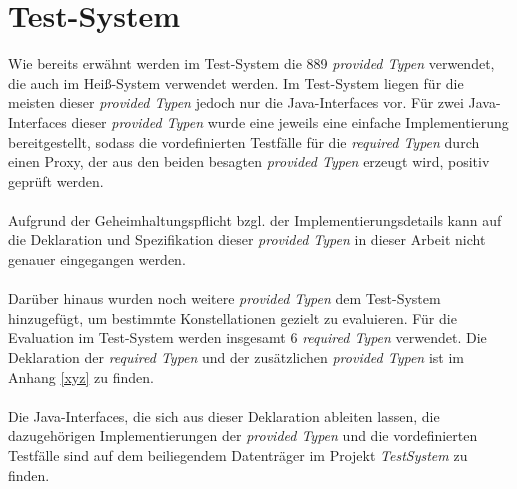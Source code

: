 \section{Test-System}\label{sec_testsystem}
Wie bereits erwähnt werden im Test-System die 889 \emph{provided Typen} verwendet, die auch im Heiß-System verwendet werden. Im Test-System liegen für die meisten dieser \emph{provided Typen} jedoch nur die Java-Interfaces vor. Für zwei Java-Interfaces dieser \emph{provided Typen} wurde eine jeweils eine einfache Implementierung bereitgestellt, sodass die vordefinierten Testfälle für die \emph{required Typen} durch einen Proxy, der aus den beiden besagten \emph{provided Typen} erzeugt wird, positiv geprüft werden.
\\\\
Aufgrund der Geheimhaltungspflicht bzgl. der Implementierungsdetails kann auf die Deklaration und Spezifikation dieser \emph{provided Typen} in dieser Arbeit nicht genauer eingegangen werden.
\\\\
Darüber hinaus wurden noch weitere \emph{provided Typen} dem Test-System hinzugefügt, um bestimmte Konstellationen gezielt zu evaluieren. Für die Evaluation im Test-System werden insgesamt 6 \emph{required Typen} verwendet. Die Deklaration der \emph{required Typen} und der zusätzlichen \emph{provided Typen} ist im Anhang \ref{xyz} zu finden.  
\\\\
Die Java-Interfaces, die sich aus dieser Deklaration ableiten lassen, die dazugehörigen Implementierungen der \emph{provided Typen} und die vordefinierten Testfälle sind auf dem beiliegendem Datenträger im Projekt \emph{TestSystem} zu finden.
%
%
%
